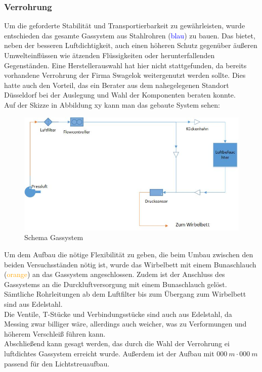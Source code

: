 \subsubsection{Verrohrung}

Um die geforderte Stabilität und Transportierbarkeit zu gewährleisten, wurde entschieden das gesamte Gassystem aus Stahlrohren (\textcolor{blue}{blau}) zu bauen. Das bietet, neben der besseren Luftdichtigkeit, auch einen höheren Schutz gegenüber äußeren Umwelteinflüssen wie ätzenden Flüssigkeiten oder herunterfallenden Gegenständen.
Eine Herstellerauswahl hat hier nicht stattgefunden, da bereits vorhandene Verrohrung der Firma Swagelok weitergenutzt werden sollte. Dies hatte auch den Vorteil, das ein Berater aus dem nahegelegenen Standort Düsseldorf bei der Auslegung und Wahl der Komponenten beraten konnte. \\
Auf der Skizze in Abbildung xy kann man das gebaute System sehen:
\hfill \\

\begin{figure}[h]
	\begin{center}
		\includegraphics[scale=0.6]{Aufbau_Gassystem.jpg}
		\caption{Schema Gassystem}
	\end{center}
\end{figure}


Um dem Aufbau die nötige Flexibilität zu geben, die beim Umbau zwischen den beiden Versuchsständen nötig ist, wurde das Wirbelbett mit einem Bunaschlauch (\textcolor{orange}{orange}) an das Gassystem angeschlossen. Zudem ist der Anschluss des Gassystems an die Durckluftversorgung mit einem Bunaschlauch gelöst. Sämtliche Rohrleitungen ab dem Luftfilter bis zum Übergang zum Wirbelbett sind aus Edelstahl. \\
Die Ventile, T-Stücke und Verbindungsstücke sind auch aus Edelstahl, da Messing zwar billiger wäre, allerdings auch weicher, was zu Verformungen und höherem Verschleiß führen kann. \\
Abschließend kann gesagt werden, das durch die Wahl der Verrohrung ei luftdichtes Gassystem erreicht wurde. Außerdem ist der Aufbau mit $\SI{000}{m} \cdot \SI{000}{m}$ passend für den Lichtstreuaufbau.


